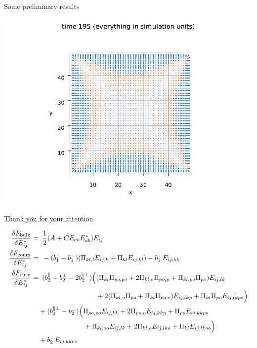 \documentclass[10pt,notes]{beamer}
\begin{document}
\begin{frame}[fragile]{Some preliminary results}
    \newrefsection
    \begin{center}
        \includegraphics[width=\textwidth]{figures/prelim4.pdf}
    \end{center}
\end{frame}

\begin{frame}[fragile]
    \newrefsection
    \vspace{4em}
    \begin{center}
        \LARGE
        \underline{Thank you for your attention}
    \end{center}
    \vspace{2em}
    \footnotesize
    \color{gray}
    \begin{align*}
        \fdv{F_\text{bulk}}{E_{ij}^*} =&\enspace \frac{1}{2}\qty(A + C E_{ab}E_{ab}^*)E_{ij} \\
        \fdv{F_\text{comp}}{E_{ij}^*} =&\enspace -(b_1^\parallel - b_1^\perp) (\Pi_{kl,l} E_{ij,k} + \Pi_{kl} E_{ij,kl}) - b_1^\perp E_{ij,kk} \\
        \fdv{F_\text{curv}}{E_{ij}^*} =&\enspace (b_2^\parallel + b_2^\perp - 2b_2^{\parallel\perp}) \Bigl( (\Pi_{kl}\Pi_{po,po} + 2\Pi_{kl,o}\Pi_{po,p} + \Pi_{kl,po}\Pi_{po})E_{ij,lk} \\
        &\phantom{\enspace (b_2^\parallel + b_2^\perp - 2b_2^{\parallel\perp}) \Bigl(}+ 2(\Pi_{kl,o}\Pi_{po} + \Pi_{kl}\Pi_{po,o})E_{ij,lkp} + \Pi_{kl}\Pi_{po}E_{ij,lkpo} \Bigr) \nonumber \\
        &+ (b_2^{\parallel\perp} - b_2^\perp)\Bigl( \Pi_{po,po}E_{ij,kk} + 2\Pi_{po,o}E_{ij,kkp} + \Pi_{po}E_{ij,kkpo} \nonumber \\ 
        &\phantom{\enspace+ (b_2^{\parallel\perp} - b_2^\perp)\Bigl(}+ \Pi_{kl,oo}E_{ij,lk} + 2\Pi_{kl,o}E_{ij,lko} + \Pi_{kl}E_{ij,lkoo} \Bigr) \nonumber \\ 
        &+ b_2^\perp E_{ij,kkoo} \nonumber
    \end{align*}
    \normalcolor\normalsize
\end{frame}
\end{document}
